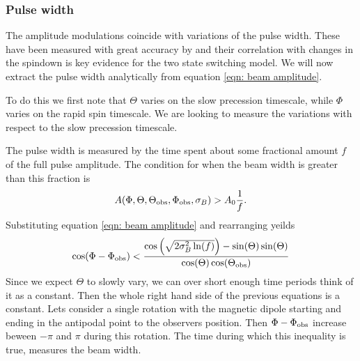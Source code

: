 \documentclass[/home/greg/Thesis/main/main.tex]{subfiles}
\begin{document}

\FloatBarrier
\subsubsection{Pulse width}
The amplitude modulations coincide with variations of the pulse width.
These have been measured with great accuracy by \citet{Lyne2010} and their
correlation with changes in the spindown is key evidence for the two
state switching model. We  will now extract the pulse width analytically from
equation \eqref{eqn: beam amplitude}.

To do this we first note that $\Theta$ varies on the slow
precession timescale, while $\Phi$ varies on the rapid spin timescale. We are
looking to measure the variations with respect to the slow precession timescale.

The pulse width is measured by the time spent about some fractional amount $f$
of the full pulse amplitude. The condition for when the beam width is greater
than this fraction is
\begin{align}
A(\Phi, \Theta, \Theta_{\mathrm{obs}}, \Phi_{\mathrm{obs}}, \sigma_{B}) > A_{0} \frac{1}{f}.
\end{align}
Substituting equation \eqref{eqn: beam amplitude} and rearranging yeilds
\begin{equation}
\cos(\Phi - \Phi_{\mathrm{obs}}) < \frac{\cos\left(\sqrt{2\sigma_{B}^{2} \ln(f)}\right) - \sin(\Theta)\sin(\Theta)}
                          {\cos(\Theta)\cos(\Theta_{\mathrm{obs}})}
\label{eqn: 6737}
\end{equation}
Since we expect $\Theta$ to slowly vary, we can over short enough time periods
think of it as a constant. Then the whole right hand side of the previous
equations is a constant. Lets consider a single rotation with the magnetic dipole
starting and ending in the antipodal point to the observers position. Then 
$\Phi - \Phi_{\mathrm{obs}}$ increase beween $-\pi$ and $\pi$ during this rotation. The
time during which this inequality is true, measures the beam width.
\end{document}

